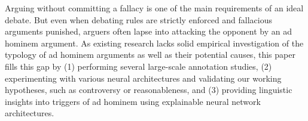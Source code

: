 Arguing without committing a fallacy is one of the main requirements of an ideal debate. But even when debating rules are strictly enforced and fallacious arguments punished, arguers often lapse into attacking the opponent by an ad hominem argument. As existing research lacks solid empirical investigation of the typology of ad hominem arguments as well as their potential causes, this paper fills this gap by (1) performing several large-scale annotation studies, (2) experimenting with various neural architectures and validating our working hypotheses, such as controversy or reasonableness, and (3) providing linguistic insights into triggers of ad hominem using explainable neural network architectures.

